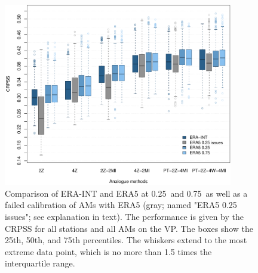 \documentclass[alpha-refs]{wiley-article}
\begin{document}
\begin{figure}[bt]
	\centering
	\includegraphics[width=100mm]{figure-2.pdf}
	\caption{Comparison of ERA-INT and ERA5 at 0.25\degree\ and 0.75\degree\ as well as a failed calibration of AMs with ERA5 (gray; named "ERA5 0.25 issues"; see explanation in text). The performance is given by the CRPSS for all stations and all AMs on the VP. The boxes show the 25th, 50th, and 75th percentiles. The whiskers extend to the most extreme data point, which is no more than 1.5 times the interquartile range.}
	\label{fig:resolution}
\end{figure}
\end{document}
